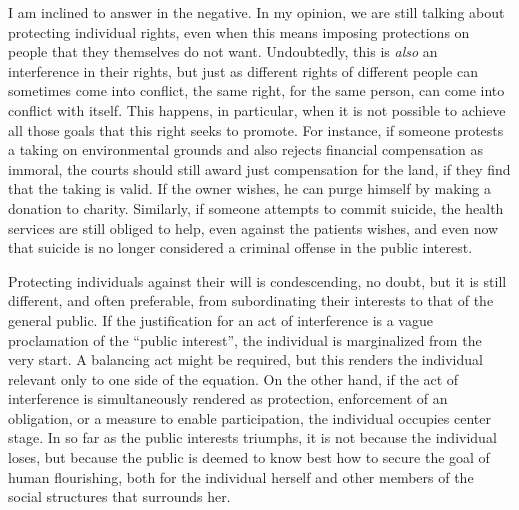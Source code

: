 I am inclined to answer in the negative. In my opinion, we are still talking about protecting individual rights, even when this means imposing protections on people that they themselves do not want. Undoubtedly, this is {\it also} an interference in their rights, but just as different rights of different people can sometimes come into conflict, the same right, for the same person, can come into conflict with itself. This happens, in particular, when it is not possible to achieve all those goals that this right seeks to promote. For instance, if someone protests a taking on environmental grounds and also rejects financial compensation as immoral, the courts should still award just compensation for the land, if they find that the taking is valid. If the owner wishes, he can purge himself by making a donation to charity. Similarly, if someone attempts to commit suicide, the health services are still obliged to help, even against the patients wishes, and even now that suicide is no longer considered a criminal offense in the public interest. 

Protecting individuals against their will is condescending, no doubt, but it is still different, and often preferable, from subordinating their interests to that of the general public. If the justification for an act of interference is a vague proclamation of the ``public interest'', the individual is marginalized from the very start. A balancing act might be required, but this renders the individual relevant only to one side of the equation. On the other hand, if the act of interference is simultaneously rendered as protection, enforcement of an obligation, or a measure to enable participation, the individual occupies center stage. In so far as the public interests triumphs, it is not because the individual loses, but because the public is deemed to know best how to secure the goal of human flourishing, both for the individual herself and other members of the social structures that surrounds her.

